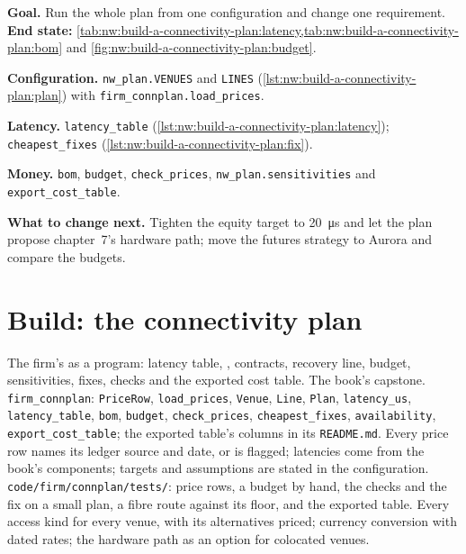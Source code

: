 \begin{tutorial}
\textbf{Goal.} Run the whole plan from one configuration and change one requirement.
\textbf{End state:} \cref{tab:nw:build-a-connectivity-plan:latency,tab:nw:build-a-connectivity-plan:bom} and
\cref{fig:nw:build-a-connectivity-plan:budget}.
\begin{tutsteps}
\item \textbf{Configuration.} \texttt{nw\_plan.VENUES} and \texttt{LINES} (\cref{lst:nw:build-a-connectivity-plan:plan}) with
  \texttt{firm\_connplan.load\_prices}.
\item \textbf{Latency.} \texttt{latency\_table} (\cref{lst:nw:build-a-connectivity-plan:latency}); \texttt{cheapest\_fixes}
  (\cref{lst:nw:build-a-connectivity-plan:fix}).
\item \textbf{Money.} \texttt{bom}, \texttt{budget}, \texttt{check\_prices}, \texttt{nw\_plan.sensitivities} and
  \texttt{export\_cost\_table}.
\end{tutsteps}
\textbf{What to change next.} Tighten the equity target to \qty{20}{\micro\second} and let the plan propose chapter~7's hardware path;
move the futures strategy to Aurora and compare the budgets.
\end{tutorial}

\section{Build: the connectivity plan}\label{bld:nw:build-a-connectivity-plan:connplan}

\begin{build}
 The firm's  as a program: latency table, , contracts, recovery line, budget,
sensitivities, fixes, checks and the exported cost table. The book's capstone.
 \texttt{firm\_connplan}: \texttt{PriceRow}, \texttt{load\_prices}, \texttt{Venue}, \texttt{Line}, \texttt{Plan},
\texttt{latency\_us}, \texttt{latency\_table}, \texttt{bom}, \texttt{budget}, \texttt{check\_prices}, \texttt{cheapest\_fixes},
\texttt{availability}, \texttt{export\_cost\_table}; the exported table's columns in its \texttt{README.md}.
 Every price row names its ledger source and date, or is flagged; latencies come from the book's components; targets and
assumptions are stated in the configuration.
 \texttt{code/firm/connplan/tests/}: price rows, a budget by hand, the checks and the fix on a small plan, a fibre
route against its floor, and the exported table.
 Every access kind for every venue, with its alternatives priced; currency conversion with dated rates; the hardware
path as an option for colocated venues.
\end{build}


